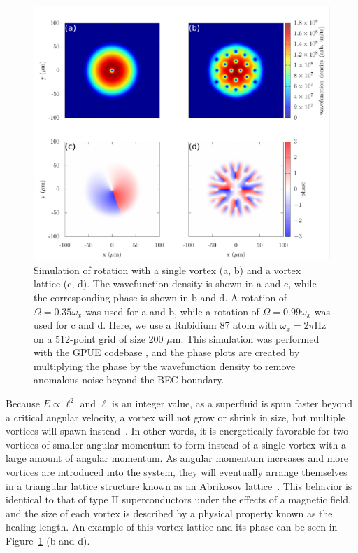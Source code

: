 \begin{figure}

\includegraphics[width=\textwidth]{data/splitop/rot/WIP.pdf}

\caption{
Simulation of rotation with a single vortex (a, b) and a vortex lattice (c, d).
The wavefunction density is shown in a and c, while the corresponding phase is shown in b and d.
A rotation of $\Omega = 0.35\omega_x$ was used for a and b, while a rotation of $\Omega = 0.99\omega_x$ was used for c and d.
Here, we use a Rubidium 87 atom with $\omega_x = 2\pi$Hz on a 512-point grid of size 200 $\mu$m.
This simulation was performed with the GPUE codebase \cite{schloss2018}, and the phase plots are created by multiplying the phase by the wavefunction density to remove anomalous noise beyond the BEC boundary.
}
\label{fig:rot}
\end{figure}

Because $E \propto \ell^2$ and $\ell$ is an integer value, as a superfluid is spun faster beyond a critical angular velocity, a vortex will not grow or shrink in size, but multiple vortices will spawn instead~\cite{pethick2002}.
In other words, it is energetically favorable for two vortices of smaller angular momentum to form instead of a single vortex with a large amount of angular momentum.
As angular momentum increases and more vortices are introduced into the system, they will eventually arrange themselves in a triangular lattice structure known as an Abrikosov lattice~\cite{abrikosov1957, fetter2001}.
This behavior is identical to that of type II superconductors under the effects of a magnetic field, and the size of each vortex is described by a physical property known as the healing length.
An example of this vortex lattice and its phase can be seen in Figure~\ref{fig:rot} (b and d).

